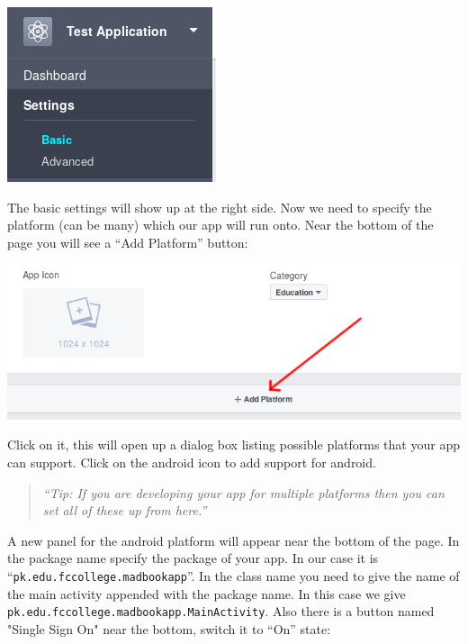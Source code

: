 \begin{center}
	\includegraphics[scale=\SourceCodeScale]{chapters/ch12/images/4}
\end{center}

The basic settings will show up at the right side. Now we need to specify the platform (can be many) which our app will run onto. Near the bottom of the page you will see a ``Add Platform'' button:

\begin{center}
	\includegraphics[scale=\SourceCodeScale]{chapters/ch12/images/5}
\end{center}

Click on it, this will open up a dialog box listing possible platforms that your app can support. Click on the android icon to add support for android. 

\begin{quote}
	\textit{``Tip: If you are developing your app for multiple platforms then you can set all of these up from here.''}
\end{quote}

A new panel for the android platform will appear near the bottom of the page. In the package name specify the package of your app. In our case it is ``\texttt{pk.edu.fccollege.madbookapp}''. In the class name you need to give the name of the main activity appended with the package name. In this case we give \texttt{pk.edu.fccollege.madbookapp.MainActivity}. Also there is a button named "Single Sign On" near the bottom, switch it to ``On'' state:

